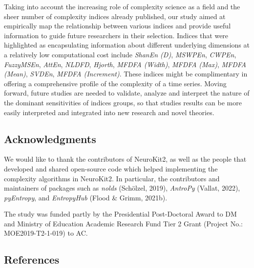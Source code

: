 \documentclass[
  man]{apa6}
\begin{document}
Taking into account the increasing role of complexity science as a field and the sheer number of complexity indices already published, our study aimed at empirically map the relationship between various indices and provide useful information to guide future researchers in their selection. Indices that were highlighted as encapsulating information about different underlying dimensions at a relatively low computational cost include \emph{ShanEn (D)}, \emph{MSWPEn}, \emph{CWPEn}, \emph{FuzzyMSEn}, \emph{AttEn}, \emph{NLDFD}, \emph{Hjorth}, \emph{MFDFA (Width)}, \emph{MFDFA (Max)}, \emph{MFDFA (Mean)}, \emph{SVDEn}, \emph{MFDFA (Increment)}. These indices might be complimentary in offering a comprehensive profile of the complexity of a time series. Moving forward, future studies are needed to validate, analyze and interpret the nature of the dominant sensitivities of indices groups, so that studies results can be more easily interpreted and integrated into new research and novel theories.

\hypertarget{acknowledgments}{%
\subsection{Acknowledgments}\label{acknowledgments}}

We would like to thank the contributors of NeuroKit2, as well as the people that developed and shared open-source code which helped implementing the complexity algorithms in NeuroKit2. In particular, the contributors and maintainers of packages such as \emph{nolds} (Schölzel, 2019), \emph{AntroPy} (Vallat, 2022), \emph{pyEntropy}, and \emph{EntropyHub} (Flood \& Grimm, 2021b).

The study was funded partly by the Presidential Post-Doctoral Award to DM and Ministry of Education Academic Research Fund Tier 2 Grant (Project No.: MOE2019-T2-1-019) to AC.

\newpage

\hypertarget{references}{%
\subsection{References}\label{references}}
\end{document}
